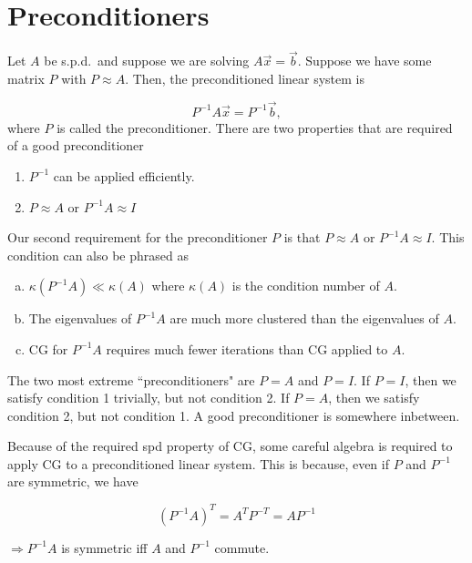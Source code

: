\section{Preconditioners}

Let $A$ be s.p.d.\ and suppose we are solving $A\vec{x}=\vec{b}$. Suppose we have some matrix $P$ with $P\approx A$. Then, the preconditioned linear system is

\begin{equation*}
    P^{-1}A\vec{x} = P^{-1}\vec{b},
\end{equation*}
where $P$ is called the preconditioner. There are two properties that are required of a good preconditioner

\begin{enumerate}[1)]
    \item $P^{-1}$ can be applied efficiently.
    \item $P\approx A$ or $P^{-1}A\approx I$
\end{enumerate}


Our second requirement for the preconditioner $P$ is that $P \approx A$ or $P^{-1}A \approx I$. This condition can also be phrased as

\begin{enumerate}[a)]
    \item $\kappa(P^{-1}A) \ll \kappa(A)$ where $\kappa(A)$ is the condition number of $A$.
    \item The eigenvalues of $P^{-1}A$ are much more clustered than the eigenvalues of $A$.
    \item CG for $P^{-1}A$ requires much fewer iterations than CG applied to $A$.
\end{enumerate}

The two most extreme ``preconditioners" are $P=A$ and $P=I$. If $P=I$, then we satisfy condition 1 trivially, but not condition 2. If $P=A$, then we satisfy condition 2, but not condition 1. A good preconditioner is somewhere inbetween.

Because of the required spd property of CG, some careful algebra is required to apply CG to a preconditioned linear system. This is because, even if $P$ and $P^{-1}$ are symmetric, we have

\begin{equation*}
    (P^{-1}A)^T = A^T P^{-T} = AP^{-1}
\end{equation*}

$\Rightarrow P^{-1}A$ is symmetric iff $A$ and $P^{-1}$ commute.

